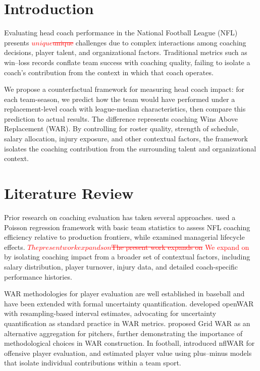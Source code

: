 \documentclass[USenglish]{article}
\newcommand{\rev}[1]{\textcolor{red}{#1}}
\newcommand{\del}[1]{\textcolor{red}{\ifmmode\mbox{\sout{\ensuremath{#1}}}\else\sout{#1}\fi}}
\theoremstyle{dgthm}
\theoremstyle{dgdef}
\begin{document}

\maketitle

\section{Introduction}

Evaluating head coach performance in the National Football League (NFL) presents \del{unique }challenges due to complex interactions among coaching decisions, player talent, and organizational factors. Traditional metrics such as win--loss records conflate team success with coaching quality, failing to isolate a coach's contribution from the context in which that coach operates.

We propose a counterfactual framework for measuring head coach impact: for each team-season, we predict how the team would have performed under a replacement-level coach with league-median characteristics, then compare this prediction to actual results. The difference represents coaching Wins Above Replacement (WAR). By controlling for roster quality, strength of schedule, salary allocation, injury exposure, and other contextual factors, the framework isolates the coaching contribution from the surrounding talent and organizational context.

\section{Literature Review}

Prior research on coaching evaluation has taken several approaches. \citet{hadley2000} used a Poisson regression framework with basic team statistics to assess NFL coaching efficiency relative to production frontiers, while \citet{goff2006} examined managerial lifecycle effects. \del{The present work expands on} \rev{We expand on} \citet{hadley2000} by isolating coaching impact from a broader set of contextual factors, including salary distribution, player turnover, injury data, and detailed coach-specific performance histories.

WAR methodologies for player evaluation are well established in baseball \citep{palmer1984,smith2008,woolner2002} and have been extended with formal uncertainty quantification. \citet{baumer2015} developed openWAR with resampling-based interval estimates, advocating for uncertainty quantification as standard practice in WAR metrics. \citet{brill2024} proposed Grid WAR as an alternative aggregation for pitchers, further demonstrating the importance of methodological choices in WAR construction. In football, \citet{yurko2019} introduced nflWAR for offensive player evaluation, and \citet{sabin2021} estimated player value using plus--minus models that isolate individual contributions within a team sport.
\end{document}
